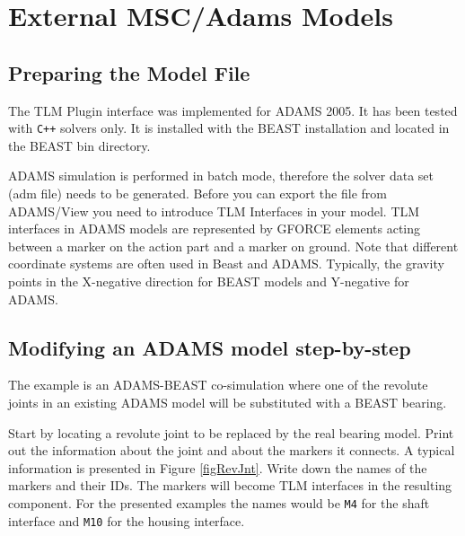 \chapter{External MSC/Adams Models}
\label{MMADAMS}

\section{Preparing the Model File}
\label{secPrepareADAMS}
The TLM Plugin interface was implemented for ADAMS 2005. 
It has been tested with \verb!C++! solvers only. 
It is installed with the BEAST installation and located in the BEAST bin directory.

ADAMS simulation is performed in batch mode, therefore the solver data set (adm file) needs to be generated.
Before you can export the file from ADAMS/View you need to introduce TLM Interfaces in your model. 
TLM interfaces in ADAMS models are represented by GFORCE elements acting between a marker on the action part and a marker on ground. 
Note that different coordinate systems are often used in Beast and ADAMS.
Typically, the gravity points in the X-negative direction for BEAST models and Y-negative for ADAMS.

\section{Modifying an ADAMS model step-by-step}
\label{secADAMSsteps}
The example is an ADAMS-BEAST co-simulation where one of the revolute joints in an existing ADAMS model will be substituted with a BEAST bearing.

Start by locating a revolute joint to be replaced by the real bearing model. 
Print out the information about the joint and about the markers it connects.
A typical information is presented in Figure \ref{figRevJnt}.
Write down the names of the markers and their IDs. 
The markers will become TLM interfaces in the resulting component. 
For the presented examples the names would be {\tt M4} for the shaft interface and {\tt M10} for the housing interface.

